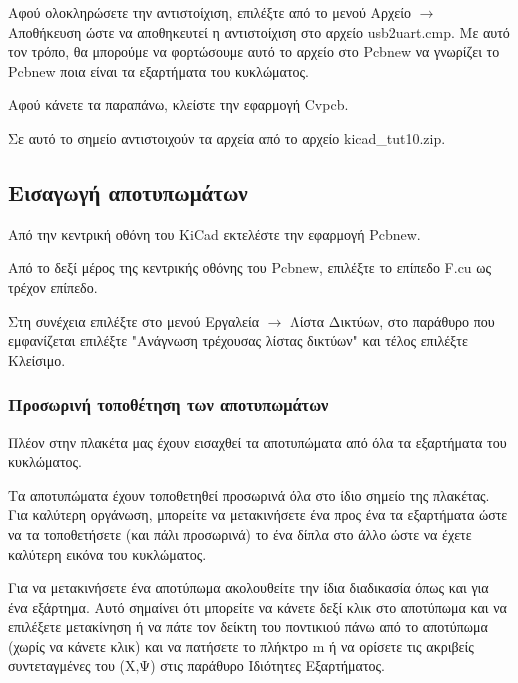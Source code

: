 \documentclass[a4paper]{article}
\begin{document}
\begin{figure}
  \begin{center}
    \label{fig:kicad-main}
  \end{center}
\end{figure}

Αφού ολοκληρώσετε την αντιστοίχιση, επιλέξτε από το μενού Αρχείο $\rightarrow$ Αποθήκευση ώστε να αποθηκευτεί η αντιστοίχιση στο αρχείο usb2uart.cmp. Με αυτό τον τρόπο, θα μπορούμε να φορτώσουμε αυτό το αρχείο στο \textenglish{Pcbnew} να γνωρίζει το \textenglish{Pcbnew} ποια είναι τα εξαρτήματα του κυκλώματος. 

Αφού κάνετε τα παραπάνω, κλείστε την εφαρμογή \textenglish{Cvpcb}.

Σε αυτό το σημείο αντιστοιχούν τα αρχεία από το αρχείο kicad\_tut10.zip.

\subsection{Εισαγωγή αποτυπωμάτων}
Από την κεντρική οθόνη του \textenglish{KiCad} εκτελέστε την εφαρμογή \textenglish{Pcbnew}. 

Από το δεξί μέρος της κεντρικής οθόνης του \textenglish{Pcbnew}, επιλέξτε το επίπεδο F.cu ως τρέχον επίπεδο.

Στη συνέχεια επιλέξτε στο μενού Εργαλεία $\rightarrow$ Λίστα Δικτύων, στο παράθυρο που εμφανίζεται επιλέξτε "Ανάγνωση τρέχουσας λίστας δικτύων" και τέλος επιλέξτε Κλείσιμο.

\subsubsection{Προσωρινή τοποθέτηση των αποτυπωμάτων}
Πλέον στην πλακέτα μας έχουν εισαχθεί τα αποτυπώματα από όλα τα εξαρτήματα του κυκλώματος. 

Τα αποτυπώματα έχουν τοποθετηθεί προσωρινά όλα στο ίδιο σημείο της πλακέτας. Για καλύτερη οργάνωση, μπορείτε να μετακινήσετε ένα προς ένα τα εξαρτήματα ώστε να τα τοποθετήσετε (και πάλι προσωρινά) το ένα δίπλα στο άλλο ώστε να έχετε καλύτερη εικόνα του κυκλώματος. 

Για να μετακινήσετε ένα αποτύπωμα ακολουθείτε την ίδια διαδικασία όπως και για ένα εξάρτημα. Αυτό σημαίνει ότι μπορείτε να κάνετε δεξί κλικ στο αποτύπωμα και να επιλέξετε μετακίνηση ή να πάτε τον δείκτη του ποντικιού πάνω από το αποτύπωμα (χωρίς να κάνετε κλικ) και να πατήσετε το πλήκτρο m ή να ορίσετε τις ακριβείς συντεταγμένες του (Χ,Ψ) στις παράθυρο Ιδιότητες Εξαρτήματος. 
\end{document}
